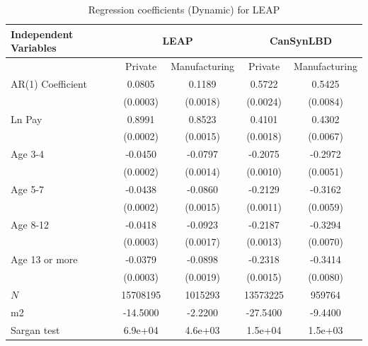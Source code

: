 \documentclass[10pt,twoside]{article}
\newcommand{\sym}[1]{\rlap{#1}}
\begin{document}
\begin{table}[H]
  \centering
\begin{threeparttable}
 \caption{Regression coefficients (Dynamic) for LEAP} \label{tab:Dynamic - GMM_can} \medskip
\renewcommand{\arraystretch}{1}
\begin{tabular}{l|c c| c c}
\toprule
\textbf{Independent Variables}&\multicolumn{2}{c|}{\textbf{LEAP}} &  \multicolumn{2}{c}{\textbf{CanSynLBD}}\\
\midrule
&\multicolumn{1}{c}{Private}&\multicolumn{1}{c}{Manufacturing}&\multicolumn{1}{c}{Private}&\multicolumn{1}{c}{Manufacturing}\\
\hline
AR(1) Coefficient&   0.0805\sym{***}&   0.1189\sym{***}&   0.5722\sym{***}&   0.5425\sym{***}\\
          & (0.0003)         & (0.0018)         & (0.0024)         & (0.0084)         \\
[1em]
Ln Pay    &   0.8991\sym{***}&   0.8523\sym{***}&   0.4101\sym{***}&   0.4302\sym{***}\\
          & (0.0002)         & (0.0015)         & (0.0018)         & (0.0067)         \\
[1em]
Age 3-4   &  -0.0450\sym{***}&  -0.0797\sym{***}&  -0.2075\sym{***}&  -0.2972\sym{***}\\
          & (0.0002)         & (0.0014)         & (0.0010)         & (0.0051)         \\
[1em]
Age 5-7   &  -0.0438\sym{***}&  -0.0860\sym{***}&  -0.2129\sym{***}&  -0.3162\sym{***}\\
          & (0.0002)         & (0.0015)         & (0.0011)         & (0.0059)         \\
[1em]
Age 8-12  &  -0.0418\sym{***}&  -0.0923\sym{***}&  -0.2187\sym{***}&  -0.3294\sym{***}\\
          & (0.0003)         & (0.0017)         & (0.0013)         & (0.0070)         \\
[1em]
Age 13 or more&  -0.0379\sym{***}&  -0.0898\sym{***}&  -0.2318\sym{***}&  -0.3414\sym{***}\\
          & (0.0003)         & (0.0019)         & (0.0015)         & (0.0080)         \\
\hline
\(N\)     & 15708195         &  1015293         & 13573225         &   959764         \\
m2        & -14.5000         &  -2.2200         & -27.5400         &  -9.4400         \\
Sargan test&  6.9e+04         &  4.6e+03         &  1.5e+04         &  1.5e+03         \\

\end{tabular}
\end{threeparttable}
\end{table}
\end{document}

